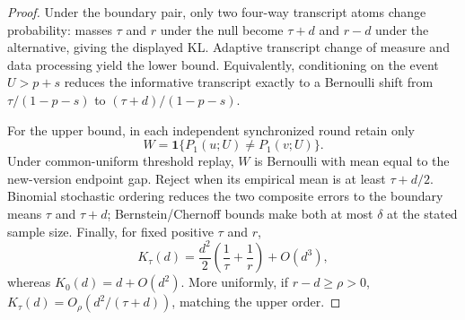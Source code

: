 \begin{proof}
Under the boundary pair, only two four-way transcript atoms change probability:
masses $\tau$ and $r$ under the null become $\tau+d$ and $r-d$ under the
alternative, giving the displayed KL.  Adaptive transcript change of measure
and data processing yield the lower bound.  Equivalently, conditioning on the
event $U>p+s$ reduces the informative transcript exactly to a Bernoulli shift
from $\tau/(1-p-s)$ to $(\tau+d)/(1-p-s)$.

For the upper bound, in each independent synchronized round retain only
\begin{equation}\label{eq:formal-results-038}
W=\mathbf 1\{P_1(u;U)\ne P_1(v;U)\}.
\end{equation}
Under common-uniform threshold replay, $W$ is Bernoulli with mean equal to the
new-version endpoint gap.  Reject when its empirical mean is at least
$\tau+d/2$.  Binomial stochastic ordering reduces the two composite errors to
the boundary means $\tau$ and $\tau+d$; Bernstein/Chernoff bounds make both at
most $\delta$ at the stated sample size.  Finally, for fixed positive $\tau$
and $r$,
\begin{equation}\label{eq:formal-results-039}
K_\tau(d)
=
\frac{d^2}{2}\left(\frac1\tau+\frac1r\right)+O(d^3),
\end{equation}
whereas $K_0(d)=d+O(d^2)$.  More uniformly, if $r-d\ge\rho>0$,
$K_\tau(d)=O_\rho(d^2/(\tau+d))$, matching the upper order.
\end{proof}


